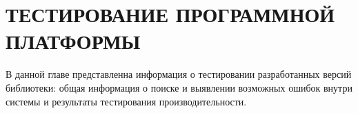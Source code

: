 \chapter{ТЕСТИРОВАНИЕ ПРОГРАММНОЙ ПЛАТФОРМЫ}

В данной главе представленна информация о тестировании разработанных версий библиотеки: общая информация о поиске и выявлении возможных ошибок внутри системы и результаты тестирования производительности.




